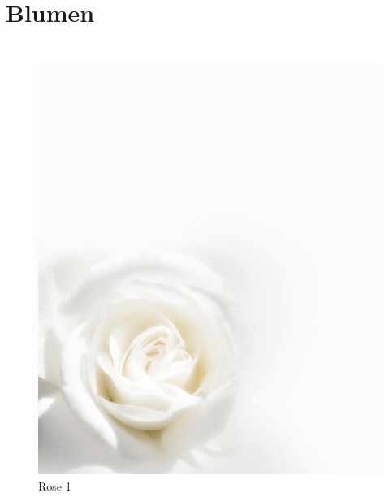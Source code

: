 \documentclass[ngerman,a4paper,11pt]{scrreprt}
\begin{document}
\chapter{Blumen}
\label{sec-3-2}

\begin{figure}[H]
\centering
\includegraphics[width=\textwidth,height=.8\textheight,keepaspectratio]{Bilder/Bilder/750_0010_8422_Hintergrund_weisse_Rose_Todesanzeige.png}
\caption{\label{img_Rose_1}Rose 1}
\end{figure}
\end{document}
